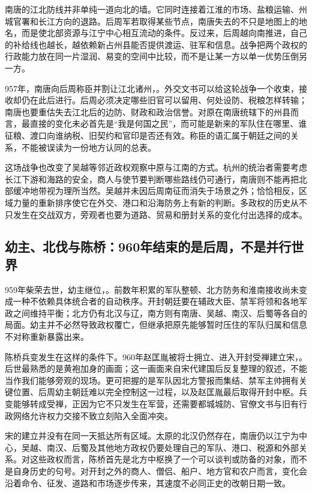南唐的江北防线并非单纯一道向北的墙。它同时连接着江淮的市场、盐粮运输、州城官署和长江方向的退路。后周军若取得某些节点，南唐失去的不只是地图上的地名，而是使北部资源与江宁中心相互流动的条件。反过来，后周越向南推进，自己的补给线也越长，越依赖新占州县能否提供渡运、驻军和信息。战争把两个政权的行政能力放在同一片湿润、易变的空间中比较，而不是让某一方以单一优势压倒另一方。

957年，南唐向后周称臣并割让江北诸州，。外交文书可以给这轮战争一个收束，接收却仍在此后进行。后周必须决定哪些旧官可以留用、何处设防、税粮怎样转输；南唐也要重估失去江北后的边防、财政和政治信誉。对原在南唐统辖下的州县而言，最直接的变化未必首先是“我是何国之民”，而可能是新来的军队住在哪里、谁征粮、渡口向谁纳税、旧契约和官印是否还有效。称臣的语汇属于朝廷之间的关系，不能被误读为一份地方认同的总表。

这场战争也改变了吴越等邻近政权观察中原与江南的方式。杭州的统治者需要考虑长江下游和海路的安全，商人与使节要判断哪些路线仍可通行，南唐则不能再把北部缓冲地带视为理所当然。吴越并未因后周南征而消失于场景之外；恰恰相反，区域力量的重新排序使它在外交、港口和沿海防务上有新的判断。多政权的历史从不只发生在交战双方，旁观者也要为道路、贸易和册封关系的变化付出选择的成本。

\subsection{幼主、北伐与陈桥：960年结束的是后周，不是并行世界}

959年柴荣去世，幼主继位，。前数年积累的军队整顿、北方防务和淮南接收尚未变成一种不依赖具体统合者的自动秩序。开封朝廷要在辅政大臣、禁军将领和各地军政之间维持平衡；北方仍有北汉与辽，南方则有南唐、吴越、南汉、后蜀等各自的局面。幼主并不必然导致政权覆亡，但继承把原先能够暂时压住的军队归属和信息不对称重新暴露出来。

陈桥兵变发生在这样的条件下。960年赵匡胤被将士拥立、进入开封受禅建立宋，。后世最熟悉的是黄袍加身的画面；这一画面来自宋代建国后反复整理的叙述，不能当作我们能够旁观的现场。更可把握的是军队因北方警报而集结、禁军主帅拥有关键位置、后周幼主朝廷难以完全控制这一过程，以及赵匡胤最后取得开封中枢。兵变能够转成受禅，正因为它不只发生在军营，还需要都城城防、官僚文书与旧有行政网络允许权力交接不致立刻陷入全面冲突。

宋的建立并没有在同一天抵达所有区域。太原的北汉仍然存在，南唐仍以江宁为中心，吴越、南汉、后蜀及其他地方政权仍要处理自己的军队、港口、税源和外部关系。对这些政权而言，陈桥首先是北方中枢换了一个可以谈判或防备的对象，而不是自身历史的句号。对开封之外的商人、僧侣、船户、地方官和农户而言，变化会沿着命令、征发、道路和市场逐步传来，其速度不必同正史的改朝日期一致。

